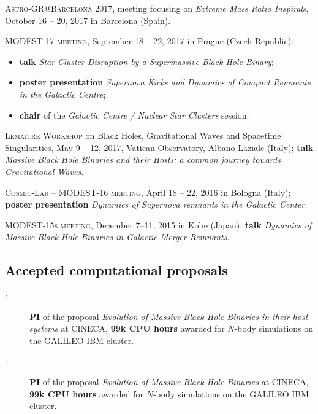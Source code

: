 \begin{etaremune}
    \item \textsc{Astro-GR@Barcelona 2017,} meeting focusing on {\it Extreme Mass Ratio Inspirals}, October 16 -- 20, 2017 in Barcelona (Spain).

    \item \textsc{ MODEST-17 meeting},  September 18 -- 22, 2017 in Prague (Czech Republic):
\vspace{-10pt}

    \begin{itemize}[leftmargin=5mm]
    \setlength\itemsep{-2pt}
        \item {\bf talk} {\it Star Cluster Disruption by a Supermassive Black Hole Binary}; 
        \item {\bf poster presentation} {\it Supernova Kicks and Dynamics of Compact Remnants in the Galactic Centre}; 
        \item {\bf chair}  of the {\it Galactic Centre / Nuclear Star Clusters} session.
    
    \end{itemize}
    \vspace{-8pt}

    \item \textsc{Lemaitre Workshop}  on Black Holes, Gravitational Waves and Spacetime Singularities, May 9 -- 12, 2017, Vatican Observatory, Albano Laziale (Italy); {\bf talk} {\it Massive Black Hole Binaries and their Hosts: a common journey towards Gravitational Waves}.

    \item \textsc{Cosmic-Lab – MODEST-16 meeting},  April 18 -- 22, 2016 in Bologna (Italy); {\bf poster presentation} {\it Dynamics of Supernova remnants in the Galactic Center}.

    \item \textsc{MODEST-15s meeting}, December 7--11, 2015 in Kobe (Japan);  {\bf talk} {\it Dynamics of Massive Black Hole Binaries in Galactic Merger Remnants}.

\end{etaremune}


\subsection*{Accepted computational proposals}

\begin{description}

    \item[:] \textbf{PI} of the proposal\textit{ Evolution of Massive Black Hole Binaries in their host systems} at CINECA, {\bf 99k CPU hours} awarded for $N$-body simulations on the GALILEO IBM cluster.

    \item[ :] \textbf{PI} of the proposal \textit{Evolution of Massive Black Hole Binaries} at CINECA, {\bf 99k CPU hours} awarded for $N$-body simulations on the GALILEO IBM cluster.
\end{description}

